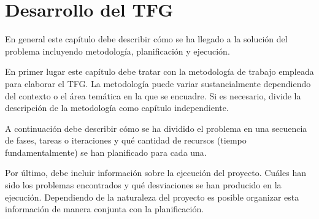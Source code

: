 \chapter{Desarrollo del TFG}
\label{ch:desarrollo}

\avisoLocalizacionArchivo 

En general este capítulo debe describir cómo se ha llegado a la solución del problema incluyendo metodología, planificación y ejecución.

En primer lugar este capítulo debe tratar con la metodología de trabajo empleada para elaborar el TFG.  La metodología puede variar sustancialmente dependiendo del contexto o el área temática en la que se encuadre.  Si es necesario, divide la descripción de la metodología como capítulo independiente.

A continuación debe describir cómo se ha dividido el problema en una secuencia de fases, tareas o iteraciones y qué cantidad de recursos (tiempo fundamentalmente) se han planificado para cada una.

Por último, debe incluir información sobre la ejecución del proyecto. Cuáles han sido los problemas encontrados y qué desviaciones se han producido en la ejecución.  Dependiendo de la naturaleza del proyecto es posible organizar esta información de manera conjunta con la planificación.

